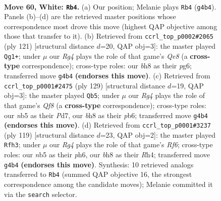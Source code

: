 \documentclass[11pt]{article}
\begin{document}
\clearpage

\begin{figure}[p]\centering
\begin{subfigure}{0.46\textwidth}\centering
\resizebox{\linewidth}{!}{%
\newchessgame
\chessboard[
  setfen={5k1b/5p2/7q/1n1P4/6R1/8/8/5K2 w - - 6 60},
  showmover=false,
  pgfstyle=straightmove, color=movearrow, markmove={g4-b4}
]}
\caption{}
\end{subfigure}\hfill
\begin{subfigure}{0.46\textwidth}\centering
\resizebox{\linewidth}{!}{%
\newchessgame
\chessboard[
  setfen={8/1k6/3Q2P1/1p6/3K4/P7/8/4q3 b - - 14 61},
  showmover=false,
  pgfstyle=straightmove, color=movearrow, markmove={e1-g1}
]}
\caption{}
\end{subfigure}
\\[4pt]
\begin{subfigure}{0.46\textwidth}\centering
\resizebox{\linewidth}{!}{%
\newchessgame
\chessboard[
  setfen={7k/3p2p1/1P6/7P/8/2K1Q3/8/5q2 b - - 4 65},
  showmover=false,
  pgfstyle=straightmove, color=movearrow, markmove={f1-b5}
]}
\caption{}
\end{subfigure}\hfill
\begin{subfigure}{0.46\textwidth}\centering
\resizebox{\linewidth}{!}{%
\newchessgame
\chessboard[
  setfen={8/8/5kpP/8/7r/5r2/P1KQ4/8 b - - 12 60},
  showmover=false,
  pgfstyle=straightmove, color=movearrow, markmove={f3-h3}
]}
\caption{}
\end{subfigure}
\caption{\textbf{Move 60, White: \texttt{Rb4}.} (a) Our position; Melanie plays \texttt{Rb4} (\texttt{g4b4}). Panels (b)--(d) are the retrieved master positions whose correspondence most drove this move (highest QAP objective among those that transfer to it). (b) Retrieved from \texttt{ccrl\_top\_p0002\#2065} (ply 121) [structural distance $d$=20, QAP obj=3]: the master played \texttt{Qg1+}; under $\mu$ our \emph{Rg4} plays the role of that game's \emph{Qe8} (a \textbf{cross-type} correspondence); cross-type roles: our \emph{b}h8 as their \emph{p}g6; transferred move \texttt{g4b4} \textbf{(endorses this move)}. (c) Retrieved from \texttt{ccrl\_top\_p0001\#2475} (ply 129) [structural distance $d$=19, QAP obj=3]: the master played \texttt{Qb5}; under $\mu$ our \emph{Rg4} plays the role of that game's \emph{Qf8} (a \textbf{cross-type} correspondence); cross-type roles: our \emph{n}b5 as their \emph{P}d7, our \emph{b}h8 as their \emph{p}b6; transferred move \texttt{g4b4} \textbf{(endorses this move)}. (d) Retrieved from \texttt{ccrl\_top\_p0001\#3237} (ply 119) [structural distance $d$=23, QAP obj=2]: the master played \texttt{Rfh3}; under $\mu$ our \emph{Rg4} plays the role of that game's \emph{Rf6}; cross-type roles: our \emph{n}b5 as their \emph{p}h6, our \emph{b}h8 as their \emph{R}h4; transferred move \texttt{g4b4} \textbf{(endorses this move)}. Synthesis: 10 retrieved analogs transferred to \texttt{Rb4} (summed QAP objective 16, the strongest correspondence among the candidate moves); Melanie committed it via the \texttt{search} selector.}
\label{fig:thought-m118}
\end{figure}
\end{document}

